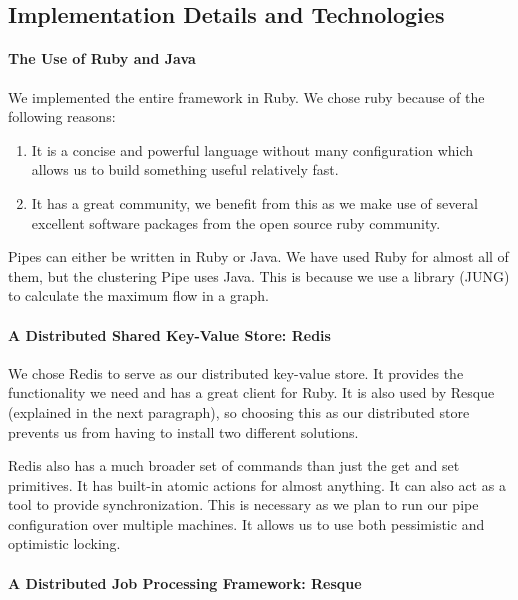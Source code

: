 \subsection{Implementation Details and Technologies}

\paragraph{The Use of Ruby and Java}

We implemented the entire framework in Ruby. We chose ruby because of the following reasons:

\begin{enumerate}
\item It is a concise and powerful language without many configuration which allows us to build something useful relatively fast.
\item It has a great community, we benefit from this as we make use of several excellent software packages from the open source ruby community.
\end{enumerate}

Pipes can either be written in Ruby or Java. We have used Ruby for almost all of them, but the clustering Pipe uses Java. This is because we use a library (JUNG) to calculate the maximum flow in a graph.

\paragraph{A Distributed Shared Key-Value Store: Redis}
\label{redis}

We chose Redis to serve as our distributed key-value store. It provides the functionality we need and has a great client for Ruby. It is also used by Resque (explained in the next paragraph), so choosing this as our distributed store prevents us from having to install two different solutions.

Redis also has a much broader set of commands than just the get and set primitives. It has built-in atomic actions for almost anything. It can also act as a tool to provide synchronization. This is necessary as we plan to run our pipe configuration over multiple machines. It allows us to use both pessimistic and optimistic locking.

\paragraph{A Distributed Job Processing Framework: Resque}
\label{resque}

